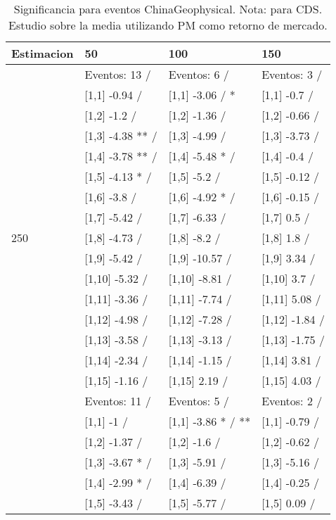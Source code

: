\begin{table}

\caption{Significancia para eventos ChinaGeophysical. Nota: para CDS. Estudio sobre la media utilizando PM como retorno de mercado.}
\centering
\begin{tabular}[t]{llll}
\toprule
Estimacion & 50 & 100 & 150\\
\midrule
 & Eventos:  13 / & Eventos:  6 / & Eventos:  3 /\\
 & {}[1,1] -0.94  / & {}[1,1] -3.06  / * & {}[1,1] -0.7  /\\
 & {}[1,2] -1.2  / & {}[1,2] -1.36  / & {}[1,2] -0.66  /\\
 & {}[1,3] -4.38 ** / & {}[1,3] -4.99  / & {}[1,3] -3.73  /\\
 & {}[1,4] -3.78 ** / & {}[1,4] -5.48 * / & {}[1,4] -0.4  /\\
\addlinespace
 & {}[1,5] -4.13 * / & {}[1,5] -5.2  / & {}[1,5] -0.12  /\\
 & {}[1,6] -3.8  / & {}[1,6] -4.92 * / & {}[1,6] -0.15  /\\
 & {}[1,7] -5.42  / & {}[1,7] -6.33  / & {}[1,7] 0.5  /\\
250 & {}[1,8] -4.73  / & {}[1,8] -8.2  / & {}[1,8] 1.8  /\\
 & {}[1,9] -5.42  / & {}[1,9] -10.57  / & {}[1,9] 3.34  /\\
\addlinespace
 & {}[1,10] -5.32  / & {}[1,10] -8.81  / & {}[1,10] 3.7  /\\
 & {}[1,11] -3.36  / & {}[1,11] -7.74  / & {}[1,11] 5.08  /\\
 & {}[1,12] -4.98  / & {}[1,12] -7.28  / & {}[1,12] -1.84  /\\
 & {}[1,13] -3.58  / & {}[1,13] -3.13  / & {}[1,13] -1.75  /\\
 & {}[1,14] -2.34  / & {}[1,14] -1.15  / & {}[1,14] 3.81  /\\
\addlinespace
 & {}[1,15] -1.16  / & {}[1,15] 2.19  / & {}[1,15] 4.03  /\\
 & Eventos:  11 / & Eventos:  5 / & Eventos:  2 /\\
 & {}[1,1] -1  / & {}[1,1] -3.86 * / ** & {}[1,1] -0.79  /\\
 & {}[1,2] -1.37  / & {}[1,2] -1.6  / & {}[1,2] -0.62  /\\
 & {}[1,3] -3.67 * / & {}[1,3] -5.91  / & {}[1,3] -5.16  /\\
\addlinespace
 & {}[1,4] -2.99 * / & {}[1,4] -6.39  / & {}[1,4] -0.25  /\\
 & {}[1,5] -3.43  / & {}[1,5] -5.77  / & {}[1,5] 0.09  /\\

\end{tabular}
\end{table}
